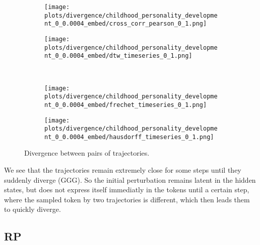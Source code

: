 \documentclass[a4paper,12pt]{article}
\begin{document}
\begin{figure}[H]
    \centering
    \begin{subfigure}[b]{0.48\textwidth}
        \centering
        \texttt{[image: plots/divergence/childhood\_personality\_development\_0\_0.0004\_embed/cross\_corr\_pearson\_0\_1.png]}
    \end{subfigure}\hfill
    \begin{subfigure}[b]{0.48\textwidth}
        \centering
        \texttt{[image: plots/divergence/childhood\_personality\_development\_0\_0.0004\_embed/dtw\_timeseries\_0\_1.png]}
    \end{subfigure}
    \\[0.5em]
    \begin{subfigure}[b]{0.48\textwidth}
        \centering
        \texttt{[image: plots/divergence/childhood\_personality\_development\_0\_0.0004\_embed/frechet\_timeseries\_0\_1.png]}
    \end{subfigure}\hfill
    \begin{subfigure}[b]{0.48\textwidth}
        \centering
        \texttt{[image: plots/divergence/childhood\_personality\_development\_0\_0.0004\_embed/hausdorff\_timeseries\_0\_1.png]}
    \end{subfigure}
    \caption{Divergence between pairs of trajectories.}
    \label{fig:distance_embed}
\end{figure}

We see that the trajectories remain extremely close for some steps until they suddenly diverge (GGG). So the initial perturbation remains latent in the hidden states, but does not express itself immediatly in the tokens until a certain step, where the sampled token by two trajectories is different, which then leads them to quickly diverge.

\subsection{RP}
\label{subsec:rp_results}
\end{document}
